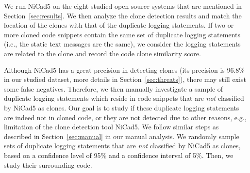 We run NiCad5 on the eight studied open source systems that are mentioned in Section~\ref{sec:results}. We then analyze the clone detection results and match the location of the clones with that of the duplicate logging statements. If two or more cloned code snippets contain the same set of duplicate logging statements (i.e., the static text messages are the same), we consider the logging statements are related to the clone and record the code clone similarity score.



Although NiCad5 has a great precision in detecting clones (its precision is 96.8\% in our studied dataset, more details in Section~\ref{sec:threats}), there may still exist some false negatives. Therefore, we then manually investigate a sample of duplicate logging statements which reside in code snippets that are {\em not} classified by NiCad5 as clones. Our goal is to study if these duplicate logging statements are indeed not in cloned code, or they are not detected due to other reasons, e.g., limitation of the clone detection tool NiCad5. We follow similar steps as described in Section~\ref{sec:manual} in our manual analysis. We randomly sample sets of duplicate logging statements that are {\em not} classified by NiCad5 as clones, based on a confidence level of 95\% and a confidence interval of 5\%. Then, we study their surrounding code.




